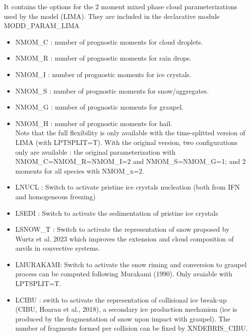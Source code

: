It contains the options for the 2 moment mixed phase cloud parameterizations
used  by the model (LIMA). They are included in the declarative module
MODD\_PARAM\_LIMA
\begin{itemize}
\item
{}
NMOM\_C : number of prognostic moments for cloud droplets.
\item
{}
NMOM\_R : number of prognostic moments for rain drops.
\item
{}
NMOM\_I : number of prognostic moments for ice crystals.
\item
{}
NMOM\_S : number of prognostic moments for snow/aggregates.
\item
{}
NMOM\_G : number of prognostic moments for graupel.
\item
{}
NMOM\_H : number of prognostic moments for hail. \\
Note that the full flexibility is only available with the time-splitted version of LIMA (with LPTSPLIT=T). With the original version, two configurations only are available : the original parameterization with NMOM\_C=NMOM\_R=NMOM\_I=2 and NMOM\_S=NMOM\_G=1; and 2 moments for all species with NMOM\_x=2.
\item
{}
LNUCL : Switch to activate pristine ice crystals nucleation (both from IFN and homogeneous freezing)
\item
{}
LSEDI : Switch to activate the sedimentation of pristine ice crystals
\item
{}
LSNOW\_T : Switch to activate the representation of snow proposed by Wurtz et al. 2023 which improves the extension and cloud composition of anvils in convective systems.
\item
{}
LMURAKAMI: Switch to activate the snow riming and conversion to graupel process can be computed following Murakami (1990). Only avaiable with LPTSPLIT=T.
\item
{}
LCIBU : swith to activate the representation of collisional ice break-up (CIBU, Hoarau et al., 2018), a secondary ice production mechanism (ice is produced by the fragmentation of snow upon impact with graupel). The number of fragments formed per collision can be fixed by XNDEBRIS\_CIBU.

\end{itemize}
